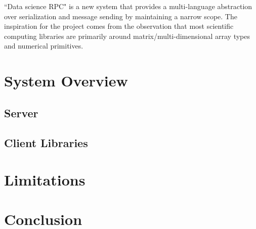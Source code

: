\documentclass[11pt]{article}
\begin{document}
``Data science RPC" is a new system that provides a multi-language abstraction over serialization and message sending by maintaining a narrow scope. The inspiration for the project comes from the observation that most scientific computing libraries are primarily around matrix/multi-dimensional array types and numerical primitives. 

\section{System Overview}

\subsection{Server}


\subsection{Client Libraries}


\section{Limitations}





\section{Conclusion}




\end{document}
